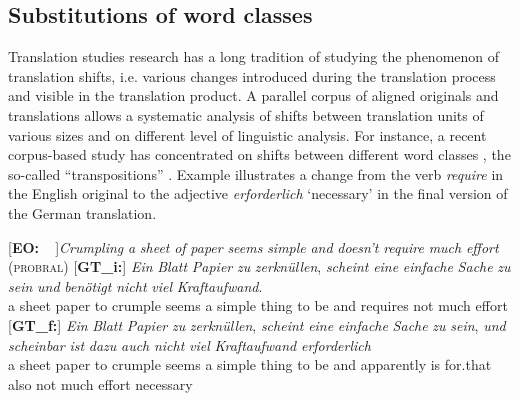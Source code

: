 \documentclass[output=paper]{LSP/langsci}
\begin{document}
\subsection{Substitutions of word classes} \label{sec:1:3:4}

Translation studies research has a long tradition of studying the phenomenon of translation shifts, i.e. various changes introduced during the translation process and visible in the translation product. A parallel corpus of aligned originals and translations allows a systematic analysis of shifts between translation units of various sizes and on different level of linguistic analysis. For instance, a recent corpus-based study has concentrated on shifts between different word classes \citep{Culo2008}, the so-called “transpositions” \citep[36]{Vinay1995/1958}. Example  illustrates a change from the verb \textit{require} in the English original to the adjective \textit{erforderlich} `necessary' in the final version of the German translation. 

\ea \label{ex:1:8}
\begin{xlist}
\exi{}[\textbf{EO:~~}]{\emph{Crumpling} \emph{a} \emph{sheet} \emph{of} \emph{paper} \emph{seems} \emph{simple} \emph{and} \emph{doesn't} \emph{require} \emph{much} \emph{effort} (\textsc{probral})}
\exi{}[\textbf{GT\_i:}]{
\gll \emph{Ein} \emph{Blatt} \emph{Papier} \emph{zu} \emph{zerknüllen}, \emph{scheint} \emph{eine} \emph{einfache} \emph{Sache} \emph{zu} \emph{sein} \emph{und} \emph{benötigt} \emph{nicht} \emph{viel} \emph{Kraftaufwand}.\\
  a sheet paper to crumple seems a simple thing to be and requires not much effort\\
}
\exi{}[\textbf{GT\_f:}]{
\gll \emph{Ein}   \emph{Blatt} \emph{Papier} \emph{zu} \emph{zerknüllen}, \emph{scheint} \emph{eine} \emph{einfache} \emph{Sache} \emph{zu} \emph{sein}, \emph{und} \emph{scheinbar} \emph{ist} \emph{dazu} \emph{auch} \emph{nicht} \emph{viel} \emph{Kraftaufwand} \emph{erforderlich}\\
a sheet paper to crumple seems a simple thing to be and apparently is for.that also not much effort necessary\\
}
\end{xlist}
\z
\end{document}
